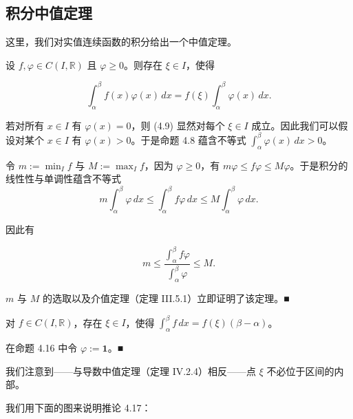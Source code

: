\subsection*{积分中值定理}

这里，我们对实值连续函数的积分给出一个中值定理。

\begin{proposition}

设 $ f, \varphi \in C(I, \mathbb{R}) $ 且 $ \varphi \ge 0 $。则存在 $ \xi \in I $，使得

\begin{equation}
\int_{\alpha}^{\beta} f(x)\varphi(x) \, dx = f(\xi)\int_{\alpha}^{\beta} \varphi(x) \, dx .\tag{4.9}
\end{equation}

\proofhead
若对所有 $ x \in I $ 有 $ \varphi(x) = 0 $，则 (4.9) 显然对每个 $ \xi \in I $ 成立。因此我们可以假设对某个 $ x \in I $ 有 $ \varphi(x) > 0 $。于是命题 4.8 蕴含不等式 $ \int_{\alpha}^{\beta} \varphi(x) \, dx > 0 $。

令 $ m := \min_{I} f $ 与 $ M := \max_{I} f $，因为 $ \varphi \ge 0 $，有 $ m\varphi \le f\varphi \le M\varphi $。于是积分的线性性与单调性蕴含不等式
\[
m\int_{\alpha}^{\beta} \varphi \, dx \le \int_{\alpha}^{\beta} f\varphi \, dx \le M\int_{\alpha}^{\beta} \varphi \, dx .
\]

因此有

\[
m \le \frac{\int_{\alpha}^{\beta} f\varphi}{\int_{\alpha}^{\beta} \varphi} \le M .
\]

$ m $ 与 $ M $ 的选取以及介值定理（定理 III.5.1）立即证明了该定理。\nobreak\hspace{0.35em}■

\end{proposition}

\begin{corollary}

对 $ f \in C(I, \mathbb{R}) $，存在 $ \xi \in I $，使得 $ \int_{\alpha}^{\beta} f \, dx = f(\xi)(\beta - \alpha) $。

\proofhead
在命题 4.16 中令 $ \varphi := \mathbf{1} $。\nobreak\hspace{0.35em}■
\end{corollary}

我们注意到——与导数中值定理（定理 IV.2.4）相反——点 $ \xi $ 不必位于区间的内部。

我们用下面的图来说明推论 4.17：


